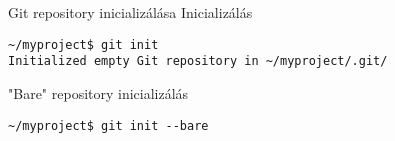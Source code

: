 
\begin{frame}[fragile]{Git repository inicializálása}
    \pause
    Inicializálás\small
\begin{verbatim}
~/myproject$ git init
Initialized empty Git repository in ~/myproject/.git/
\end{verbatim}
    \normalsize
    
    \pause
    "Bare" repository inicializálás\small
\begin{verbatim}
~/myproject$ git init --bare
\end{verbatim}
    \normalsize
\end{frame}


